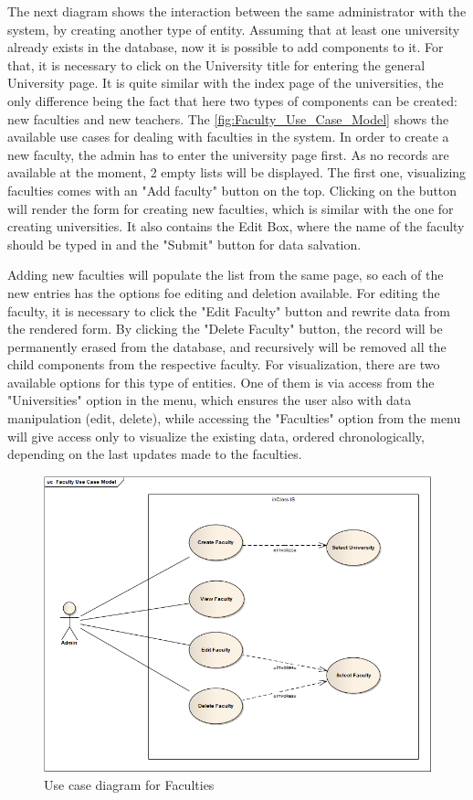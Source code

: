 The next diagram shows the interaction between the same administrator with the system, by creating another type of entity. Assuming that at least one university already exists in the database, now it is possible to add components to it. For that, it is necessary to click on the University title for entering the general University page. It is quite similar with the index page of the universities, the only difference being the fact that here two types of components can be created: new faculties and new teachers. The \autoref{fig:Faculty_Use_Case_Model} shows the available use cases for dealing with faculties in the system. In order to create a new faculty, the admin has to enter the university page first. As no records are available at the moment, 2 empty lists will be displayed. The first one, visualizing faculties comes with an "Add faculty" button on the top. Clicking on the button will render the form for creating new faculties, which is similar with the one for creating universities. It also contains the Edit Box, where the name of the faculty should be typed in and the "Submit" button for data salvation. 

Adding new faculties will populate the list from the same page, so each of the new entries has the options foe editing and deletion available. For editing the faculty, it is necessary to click the "Edit Faculty" button and rewrite data from the rendered form. By clicking the "Delete Faculty" button, the record will be permanently erased from the database, and recursively will be removed all the child components from the respective faculty.  For visualization, there are two available options for this type of entities. One of them is via access from the "Universities" option in the menu, which ensures the user also with data manipulation (edit, delete), while accessing the "Faculties" option from the menu will give access only to visualize the existing data, ordered chronologically, depending on the last updates made to the faculties.

\begin{figure}[H]
\centering
\includegraphics[width=14cm]{Chapter2/Faculty_Use_Case_Model.png}
\caption{Use case diagram for Faculties}
\label{fig:Faculty_Use_Case_Model}
\end{figure}
\newpage

